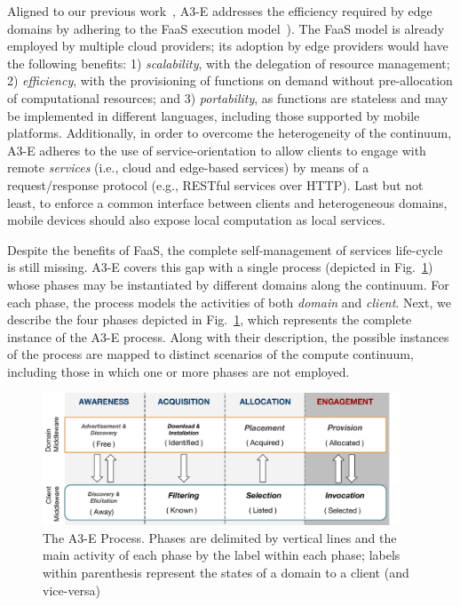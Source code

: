 
Aligned to our previous work~\cite{GarrigaMendonca2017}, A3-E addresses the efficiency required by edge domains by adhering to the FaaS execution model~\cite{MateosFaaster17}). 
The FaaS model is already employed by multiple cloud providers; its adoption by edge providers would have the following benefits: 1) \textit{scalability}, with the delegation of resource management; 2) \textit{efficiency}, with the provisioning of functions on demand without pre-allocation of computational resources; and 3) \textit{portability}, as functions are stateless and may be implemented in different languages, including those supported by mobile platforms. Additionally, in order to overcome the heterogeneity of the continuum, A3-E adheres to the use of service-orientation to allow clients to engage with remote \textit{services} (i.e., cloud and edge-based services) by means of a request/response protocol (e.g., RESTful services over HTTP). Last but not least, to enforce a common interface between clients and heterogeneous domains, mobile devices should also expose local computation as local services. 

Despite the benefits of FaaS, the complete self-management of services life-cycle is still missing. A3-E covers this gap with a single process (depicted in Fig.~\ref{fig:A3-E-process}) whose phases may be instantiated by different domains along the continuum. For each phase, the process models the activities of both \textit{domain} and \textit{client}. Next, we describe the four phases depicted in Fig.~\ref{fig:A3-E-process}, which represents the complete instance of the A3-E process. Along with their description, the possible instances of the process are mapped to distinct scenarios of the compute continuum, including those in which one or more phases are not employed.


\begin{figure}[tbp]
	\includegraphics[width=0.95\textwidth]{figs/A3-E-process}
	\caption{The A3-E Process. Phases are delimited by vertical lines and the main activity of each phase by the label within each phase; labels within parenthesis represent the states of a domain to a client (and vice-versa)}
	\label{fig:A3-E-process}
\end{figure}



